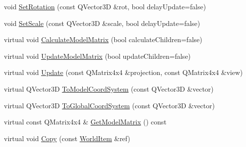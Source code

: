 \begin{DoxyCompactItemize}
void \mbox{\hyperlink{class_geometry_engine_1_1_geometry_world_item_1_1_world_item_afe2d2f6812d148817f73c12a14218941}{Set\+Rotation}} (const Q\+Vector3D \&rot, bool delay\+Update=false)
\item 
void \mbox{\hyperlink{class_geometry_engine_1_1_geometry_world_item_1_1_world_item_a0c1d06ab783adb8fd8b574b428933aed}{Set\+Scale}} (const Q\+Vector3D \&scale, bool delay\+Update=false)
\item 
virtual void \mbox{\hyperlink{class_geometry_engine_1_1_geometry_world_item_1_1_world_item_a15405881b3e3de9f417484160ab5c735}{Calculate\+Model\+Matrix}} (bool calculate\+Children=false)
\item 
virtual void \mbox{\hyperlink{class_geometry_engine_1_1_geometry_world_item_1_1_world_item_a86effd24c41c87be8925ee3addd8c33d}{Update\+Model\+Matrix}} (bool update\+Children=false)
\item 
virtual void \mbox{\hyperlink{class_geometry_engine_1_1_geometry_world_item_1_1_world_item_aa6e82e5d95ae34d0addb991cd84aca6f}{Update}} (const Q\+Matrix4x4 \&projection, const Q\+Matrix4x4 \&view)
\item 
virtual Q\+Vector3D \mbox{\hyperlink{class_geometry_engine_1_1_geometry_world_item_1_1_world_item_a8391874ad6063fe8b09d7e6978dd0f20}{To\+Model\+Coord\+System}} (const Q\+Vector3D \&vector)
\item 
virtual Q\+Vector3D \mbox{\hyperlink{class_geometry_engine_1_1_geometry_world_item_1_1_world_item_a8ec661078740d53d1912f68a5bdb84f3}{To\+Global\+Coord\+System}} (const Q\+Vector3D \&vector)
\item 
virtual const Q\+Matrix4x4 \& \mbox{\hyperlink{class_geometry_engine_1_1_geometry_world_item_1_1_world_item_a341eff00c85bddf6ced93102ddf18408}{Get\+Model\+Matrix}} () const
\item 
virtual void \mbox{\hyperlink{class_geometry_engine_1_1_geometry_world_item_1_1_world_item_aa7fdb225408eb03fcf542cbee76a435f}{Copy}} (const \mbox{\hyperlink{class_geometry_engine_1_1_geometry_world_item_1_1_world_item}{World\+Item}} \&ref)
\end{DoxyCompactItemize}
